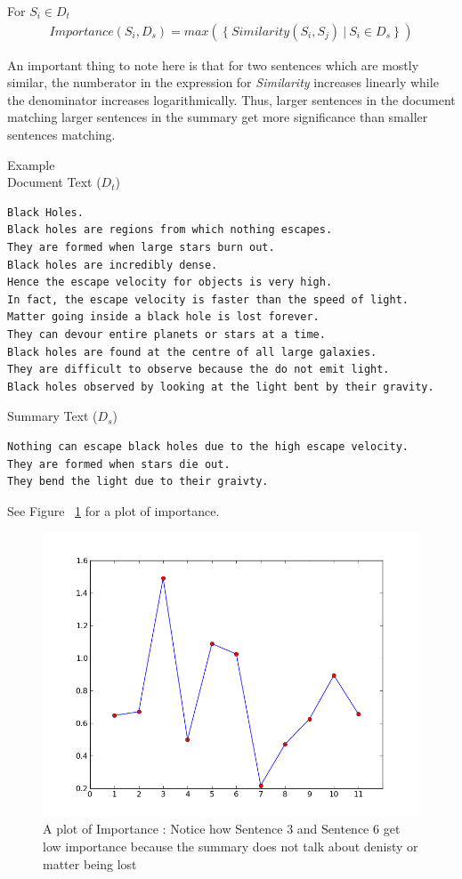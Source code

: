 \documentclass[paper=a4, fontsize=11pt]{scrartcl} %
\numberwithin{equation}{section} %
\numberwithin{figure}{section} %
\numberwithin{table}{section} %
\begin{document}
For $S_i \in D_t$ 
\begin{align}
Importance(S_i,D_s) = max(\ \{\ Similarity(S_i,S_j)\ |\ S_i \in D_s\ \}\ )  
\end{align}

An important thing to note here is that for two sentences which are mostly similar, the numberator in the expression for \emph{Similarity} increases linearly while the denominator increases logarithmically. Thus, larger sentences in the document matching larger sentences in the  summary get more significance than smaller sentences matching.\\
\par
{{\large Example}} \\
{Document Text ($D_t$)}
\begin{lstlisting}
Black Holes.
Black holes are regions from which nothing escapes.
They are formed when large stars burn out.
Black holes are incredibly dense.
Hence the escape velocity for objects is very high.
In fact, the escape velocity is faster than the speed of light.
Matter going inside a black hole is lost forever.
They can devour entire planets or stars at a time.
Black holes are found at the centre of all large galaxies.
They are difficult to observe because the do not emit light.
Black holes observed by looking at the light bent by their gravity.
\end{lstlisting}
 \vspace{1.2em}
{Summary Text ($D_s$)}
\begin{lstlisting}
Nothing can escape black holes due to the high escape velocity.
They are formed when stars die out.
They bend the light due to their graivty.
\end{lstlisting}
See Figure ~\ref{fig:importance} for a plot of importance.

\begin{figure}[h!]
  \centering
    \includegraphics[width=.8\textwidth]{images/importance}
    \caption{A plot of Importance : Notice how Sentence 3 and Sentence 6 get low importance because the summary does not talk about denisty or matter being lost}
    \label{fig:importance}
\end{figure}
\pagebreak
\end{document}
